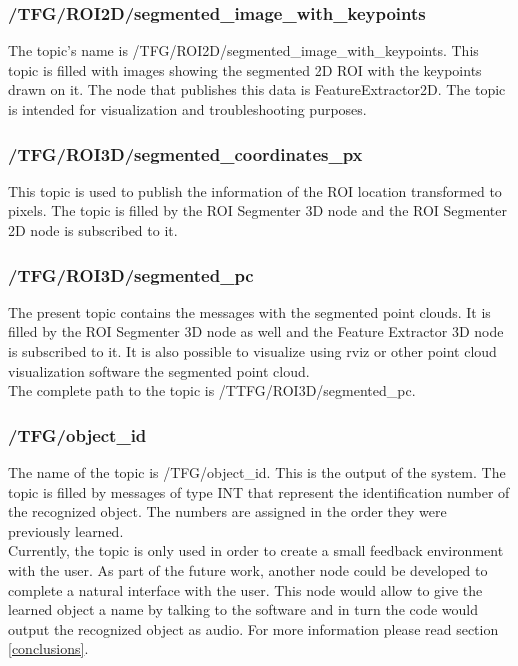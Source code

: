 \subsubsection{/TFG/ROI2D/segmented\_image\_with\_keypoints}
The topic's name is /TFG/ROI2D/segmented\_image\_with\_keypoints. This topic is filled with images showing the segmented 2D ROI with the keypoints drawn on it. The node that publishes this data is FeatureExtractor2D. The topic is intended for visualization and troubleshooting purposes. 

\subsubsection{/TFG/ROI3D/segmented\_coordinates\_px}
This topic is used to publish the information of the ROI location transformed to pixels. The topic is filled by the ROI Segmenter 3D node and the ROI Segmenter 2D node is subscribed to it. 

\subsubsection{/TFG/ROI3D/segmented\_pc}
The present topic contains the messages with the segmented point clouds. It is filled by the ROI Segmenter 3D node as well and the Feature Extractor 3D node is subscribed to it. It is also possible to visualize using rviz or other point cloud visualization software the segmented point cloud. 
\\

The complete path to the topic is /TTFG/ROI3D/segmented\_pc.


\subsubsection{/TFG/object\_id}
The name of the topic is /TFG/object\_id. This is the output of the system. The topic is filled by messages of type INT that represent the identification number of the recognized object. The numbers are assigned in the order they were previously learned. 
\\

Currently, the topic is only used in order to create a small feedback environment with the user. As part of the future work, another node could be developed to complete a natural interface with the user. This node would allow to give the learned object a name by talking to the software and in turn the code would output the recognized object as audio. For more information please read section \ref{conclusions}.